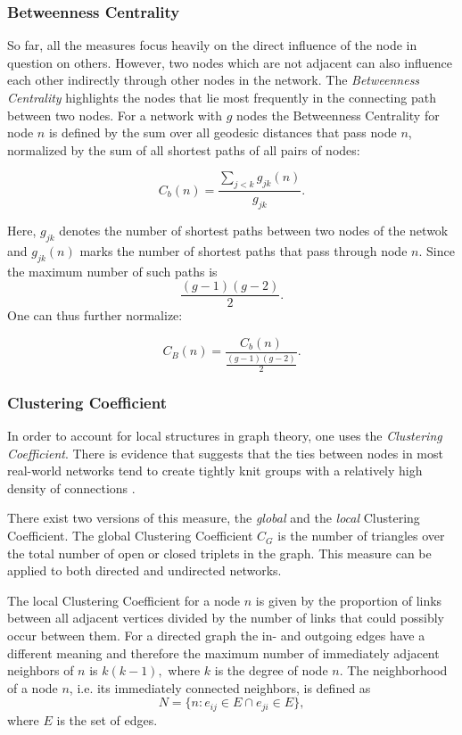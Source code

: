 \subsubsection{Betweenness Centrality}

So far, all the measures focus heavily on the direct influence of the node in question on others. However, two nodes which are not adjacent can also influence each other indirectly through other nodes in the network. The \emph{Betweenness Centrality} highlights the nodes that lie most frequently in the connecting path between two nodes. For a network with $g$ nodes the Betweenness Centrality for node $n$ is defined by the sum over all geodesic distances that pass node $n$, normalized by the sum of all shortest paths of all pairs of nodes:

\begin{equation*}
C_b(n) = \frac{\sum\limits_{j<k} g_{jk}(n)}{g_{jk}}.
\end{equation*}

Here, $g_{jk}$ denotes the number of shortest paths between two nodes of the netwok and $g_{jk}(n)$ marks the number of shortest paths that pass through node $n$. Since the maximum number of such paths is $$\frac{(g-1)(g-2)}{2}.$$ One can thus further normalize:

\begin{equation}
C_B(n) = \frac{C_b(n)}{\frac{(g-1)(g-2)}{2}}.
\end{equation}

\subsubsection{Clustering Coefficient}

In order to account for local structures in graph theory, one uses the \emph{Clustering Coefficient}. There is evidence that suggests that the ties between nodes in most real-world networks tend to create tightly knit groups with a relatively high density of connections \cite{graphcluster}. 

There exist two versions of this measure, the \emph{global} and the \emph{local} Clustering Coefficient. The global Clustering Coefficient $C_G$ is the number of triangles over the total number of open or closed triplets in the graph. This measure can be applied to both directed and undirected networks.

The local Clustering Coefficient for a node $n$ is given by the proportion of links between all adjacent vertices divided by the number of links that could possibly occur between them. For a directed graph the in- and outgoing edges have a different meaning and therefore the maximum number of immediately adjacent neighbors of $n$ is $k (k-1),$ where $k$ is the degree of node $n$. The neighborhood of a node $n$, i.e. its immediately connected neighbors, is defined as $$N = \{n: e_{ij}\in E \cap e_{ji} \in E\},$$ where $E$ is the set of edges. 

